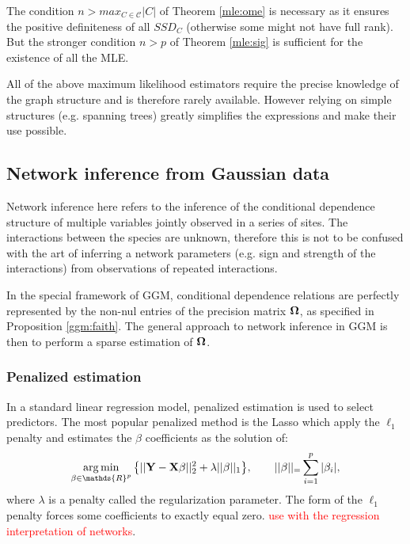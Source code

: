 The condition $n>max_{C\in\mathcal{C}}|C|$ of Theorem \ref{mle:ome} is necessary as it ensures the positive definiteness of all $SSD_C$ (otherwise some might not have full rank). But the stronger condition $n>p$ of Theorem \ref{mle:sig} is sufficient for the existence of all the MLE. 

 All of the above maximum likelihood estimators require the precise knowledge of the graph structure and is therefore rarely available. However relying on simple structures (e.g. spanning trees) greatly simplifies the expressions and make their use possible.

\subsection{Network inference from Gaussian data}
  Network inference here refers to the inference of the conditional dependence structure of multiple variables jointly observed in a series of sites. The interactions between the species are unknown, therefore this is not to be confused with the art of inferring a network parameters (e.g. sign and strength of the interactions) from observations of repeated interactions.
  
In the special framework of GGM, conditional dependence relations are perfectly represented by the non-nul entries of the precision matrix ${\boldsymbol{\Omega}}$, as specified in Proposition \ref{ggm:faith}. The general approach to network inference in GGM is then to perform a sparse estimation of ${\boldsymbol{\Omega}}$.

 \subsubsection{Penalized estimation}
 In a standard linear regression model, penalized estimation is used to select predictors. The most popular penalized method is the Lasso \citep{lasso} which apply the $\ell_1$ penalty and estimates the $\beta$ coefficients as the solution of:
 $$\argmin_{\beta \in \mathds{R}^p} \big\{ ||\Yb - \Xb\beta ||^2_2 + \lambda ||\beta||_1\big\}, \qquad ||\beta||_=\sum_{i=1}^p |\beta_i|,$$
 where $\lambda$ is a penalty called the regularization parameter.  The form of the $\ell_1$ penalty forces some coefficients to exactly equal zero.
 \textcolor{red}{use with the regression interpretation of networks}.
 
